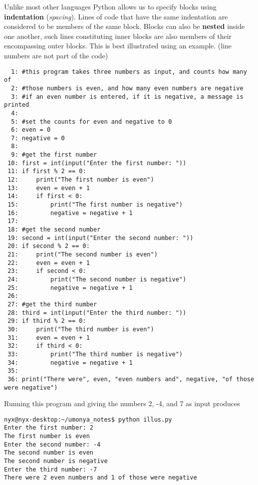 Unlike most other languages Python allows us to specify blocks using   \textbf{indentation} (\textit{spacing}). Lines of code that have the same   indentation are considered to be members of the same block. Blocks can   also be \textbf{nested} inside one another, such lines   constituting inner blocks are also members of their encompassing outer   blocks. This is best illustrated using an example. (line numbers are   not part of the code)
\begin{lstlisting}
  1: #this program takes three numbers as input, and counts how many of
  2: #those numbers is even, and how many even numbers are negative
  3: #if an even number is entered, if it is negative, a message is printed
  4: 
  5: #set the counts for even and negative to 0
  6: even = 0
  7: negative = 0
  8: 
  9: #get the first number
 10: first = int(input("Enter the first number: "))
 11: if first % 2 == 0:
 12:     print("The first number is even")
 13:     even = even + 1
 14:     if first < 0:
 15:         print("The first number is negative")
 16:         negative = negative + 1
 17: 
 18: #get the second number
 19: second = int(input("Enter the second number: "))
 20: if second % 2 == 0:
 21:     print("The second number is even")
 22:     even = even + 1
 23:     if second < 0:
 24:         print("The second number is negative")
 25:         negative = negative + 1
 26: 
 27: #get the third number
 28: third = int(input("Enter the third number: "))
 29: if third % 2 == 0:
 30:     print("The third number is even")
 31:     even = even + 1
 32:     if third < 0:
 33:         print("The third number is negative")
 34:         negative = negative + 1
 35: 
 36: print("There were", even, "even numbers and", negative, "of those were negative")
\end{lstlisting}

Running this program and giving the numbers 2, -4, and 7 as input   produces
\begin{lstlisting}[keywords={}]
nyx@nyx-desktop:~/umonya_notes$ python illus.py
Enter the first number: 2
The first number is even
Enter the second number: -4
The second number is even
The second number is negative
Enter the third number: -7
There were 2 even numbers and 1 of those were negative
\end{lstlisting}

